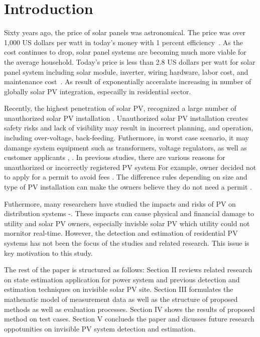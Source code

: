 \section{Introduction}


Sixty years ago, the price of solar panels was astronomical.  The price was over 1,000 US dollars per watt in today's money with 1 percent efficiency~\cite{b18}.
As the cost continues to drop, solar panel systems are becoming much more viable for the average household.
Today's price is less than 2.8 US dollars per watt for solar panel system including solar module, inverter, wiring hardware, labor cost, and maintenance cost~\cite{b19}.
As result of exponentially acceralate increasing in number of globally solar PV integration, especailly in residential sector.

Recently, the highest penetration of solar PV, recognized a large number of unauthorized solar PV installation \cite{b26}.
Unauthorized solar PV installation creates safety risks and lack of visibility may result in incorrect planning, and operation, including over-voltage, back-feeding.
Futhermore, in worst case scenario, it may damange system equipment such as transformers, voltage regulators, as well as customer applicants \cite{b15}, \cite{b16}.
In previous studies, there are various reasons for unauthorized or incorrectly registered PV system
For example, owner decided not to apply for a permit to avoid fees \cite{b17}.
The difference rules depending on size and type of PV installation can make the owners believe they do not need a permit \cite{b30}.

Futhermore, many researchers have studied the impacts and risks of PV on distribution systems \cite{b20}-\cite{b25}.
These impacts can cause physical and financial damage to utility and solar PV owners, especially invisble solar PV which utility could not mornitor real-time.
However, the detection and estimation of residential PV systems has not been the focus of the studies and related research.
This issue is key motivation to this study.



The rest of the paper is structured as follows: Section II reviews related research on state estimation application for power system and previous detection and estimation techniques on invisible solar PV site.
Section III formulates the mathenatic model of measurement data as well as the structure of proposed methods as well as evaluation processes.
Section IV shows the results of proposed method on test cases.
Section V conclueds the paper and dicusses future research oppotunities on invisible PV system detection and estimation.

